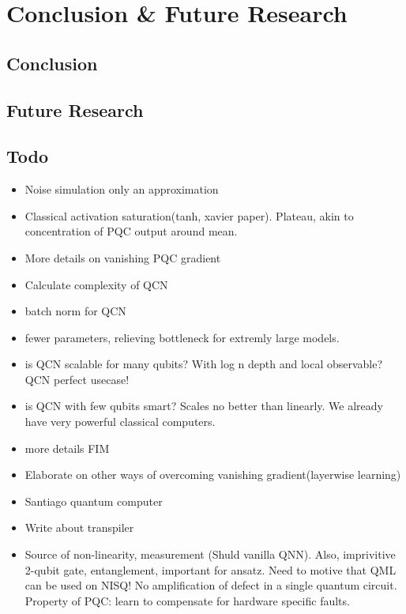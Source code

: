 \chapter{Conclusion \& Future Research}\label{chap:Conclusion}

\section{Conclusion}\label{sec:conclusion}


\section{Future Research}\label{sec:future}


\section{Todo}\label{sec:todo}

\begin{itemize}
    \item Noise simulation only an approximation
    \item Classical activation saturation(tanh, xavier paper). Plateau, akin to concentration of PQC output around mean.  
    \item More details on vanishing PQC gradient
    \item Calculate complexity of QCN
    \item batch norm for QCN
    \item fewer parameters, relieving bottleneck for extremly large models. 
    \item is QCN scalable for many qubits? With log n depth and local observable? QCN perfect usecase!
    \item is QCN with few qubits smart? Scales no better than linearly. We already have very powerful classical computers. 
    \item more details FIM
    \item Elaborate on other ways of overcoming vanishing gradient(layerwise learning)
    \item Santiago quantum computer
    \item Write about transpiler
    \item Source of non-linearity, measurement (Shuld vanilla QNN). Also, imprivitive 2-qubit gate, entanglement, important for ansatz. Need to motive that QML can be used on NISQ! No amplification of defect in a single quantum circuit. Property of PQC: learn to compensate for hardware specific faults. 
\end{itemize}
